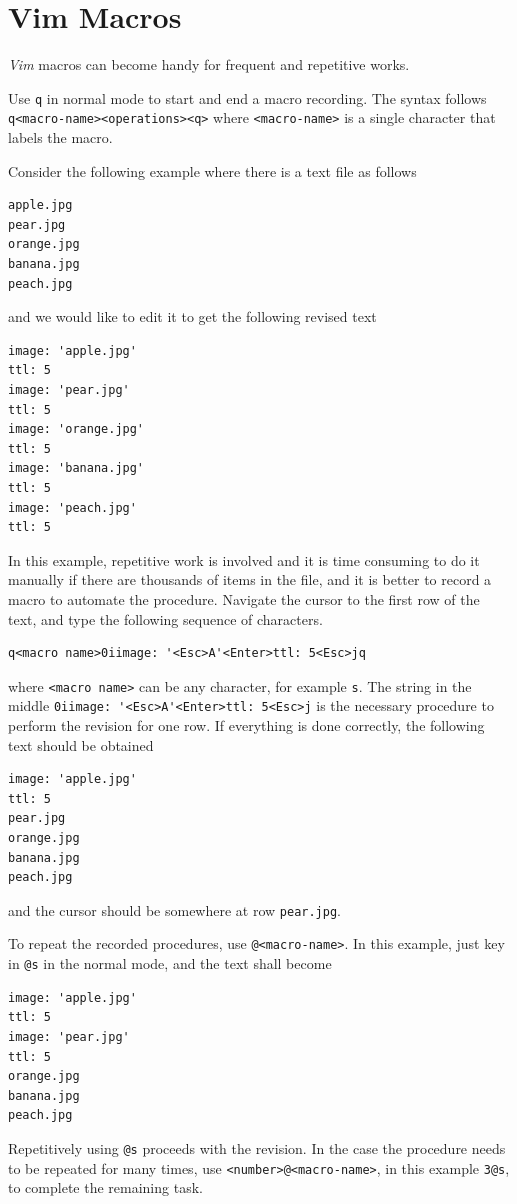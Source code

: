 \section{Vim Macros}

\textit{Vim} macros can become handy for frequent and repetitive works.

Use \verb|q| in normal mode to start and end a macro recording. The syntax follows \verb|q<macro-name><operations><q>| where \verb|<macro-name>| is a single character that labels the macro.

Consider the following example where there is a text file as follows
\begin{lstlisting}
apple.jpg
pear.jpg
orange.jpg
banana.jpg
peach.jpg
\end{lstlisting}
and we would like to edit it to get the following revised text
\begin{lstlisting}
image: 'apple.jpg'
ttl: 5
image: 'pear.jpg'
ttl: 5
image: 'orange.jpg'
ttl: 5
image: 'banana.jpg'
ttl: 5
image: 'peach.jpg'
ttl: 5
\end{lstlisting}

In this example, repetitive work is involved and it is time consuming to do it manually if there are thousands of items in the file, and it is better to record a macro to automate the procedure. Navigate the cursor to the first row of the text, and type the following sequence of characters.
\begin{lstlisting}
q<macro name>0iimage: '<Esc>A'<Enter>ttl: 5<Esc>jq
\end{lstlisting}
where \verb|<macro name>| can be any character, for example \verb|s|. The string in the middle \verb|0iimage: '<Esc>A'<Enter>ttl: 5<Esc>j| is the necessary procedure to perform the revision for one row. If everything is done correctly, the following text should be obtained
\begin{lstlisting}
image: 'apple.jpg'
ttl: 5
pear.jpg
orange.jpg
banana.jpg
peach.jpg
\end{lstlisting}
and the cursor should be somewhere at row \verb|pear.jpg|.

To repeat the recorded procedures, use \verb|@<macro-name>|. In this example, just key in \verb|@s| in the normal mode, and the text shall become
\begin{lstlisting}
image: 'apple.jpg'
ttl: 5
image: 'pear.jpg'
ttl: 5
orange.jpg
banana.jpg
peach.jpg
\end{lstlisting}

Repetitively using \verb|@s| proceeds with the revision. In the case the procedure needs to be repeated for many times, use \verb|<number>@<macro-name>|, in this example \verb|3@s|, to complete the remaining task.

